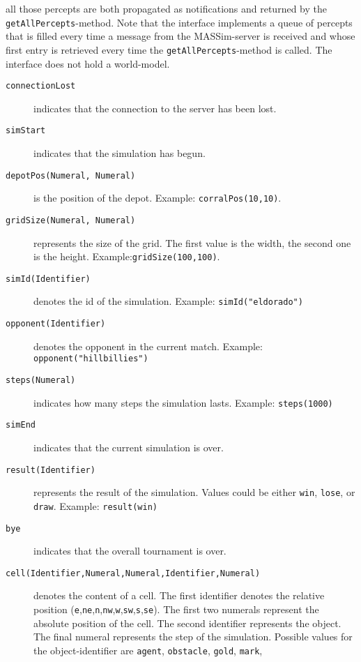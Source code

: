 \documentclass[a4]{article}
\begin{document}
 all those percepts are both propagated as notifications and returned by the
\texttt{getAllPercepts}-method. Note that the interface implements a queue of percepts that is filled every time
a message from the MASSim-server is received and whose first entry is retrieved every time the \texttt{getAllPercepts}-method is called. The interface does not hold a world-model.
\begin{description}
\item[\texttt{connectionLost}] indicates that the connection to the server has been lost. 
\item[\texttt{simStart}] indicates that the simulation has begun.
\item[\texttt{depotPos(Numeral, Numeral)}] is the position of the depot. Example: \texttt{corralPos(10,10)}.
\item[\texttt{gridSize(Numeral, Numeral)}] represents the size of the grid. The first value is the width, the second one is 
the height. Example:\texttt{gridSize(100,100)}.
\item[\texttt{simId(Identifier)}] denotes the id of the simulation. Example: \texttt{simId("eldorado")}
\item[\texttt{opponent(Identifier)}] denotes the opponent in the current match. 
Example: \texttt{opponent("hillbillies")}
\item[\texttt{steps(Numeral)}] indicates how many steps the simulation lasts. Example: \texttt{steps(1000)}
\item[\texttt{simEnd}] indicates that the current simulation is over.
\item[\texttt{result(Identifier)}] represents the result of the simulation. Values could be either \texttt{win},  
\texttt{lose}, or  \texttt{draw}. Example: \texttt{result(win)}
\item[\texttt{bye}] indicates that the overall tournament is over.
\item[\texttt{cell(Identifier,Numeral,Numeral,Identifier,Numeral)}] denotes the content of a cell. 
The first identifier denotes the relative position (\texttt{e},\texttt{ne},\texttt{n},\texttt{nw},\texttt{w},\texttt{sw},\texttt{s},\texttt{se}). 
The first two numerals represent the absolute position of the cell. 
The second identifier represents the object. The final numeral represents the step of the simulation.
Possible values for the object-identifier are \texttt{agent}, \texttt{obstacle}, \texttt{gold}, \texttt{mark}, 

\end{description}
\end{document}
